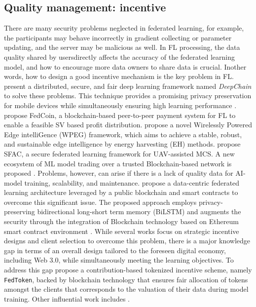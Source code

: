 \documentclass{article}
\begin{document}
\subsection{Quality management: incentive}
There are many security problems neglected in federated learning, for example, the participants may behave incorrectly in gradient collecting or parameter updating, and the server may be malicious as well. In FL processing, the data quality shared by usersdirectly aﬀects the accuracy of the federated learning model, and how to encourage more data owners to share data is crucial. Inother words, how to design a good incentive mechanism is the key problem in FL. 
\newline \newline \cite{weng_2019} present a distributed, secure, and fair deep learning framework named \textit{DeepChain} to solve these problems. This technique provides a promising privacy preservation for mobile devices while simultaneously ensuring high learning performance \cite{kang_2019}. \cite{liu_fedcoin_2020} propose FedCoin, a blockchain-based peer-to-peer payment system for FL to enable a feasible SV based profit distribution. \cite{lin_2022} propose a novel Wirelessly Powered Edge intelliGence (WPEG) framework, which aims to achieve a stable, robust, and sustainable edge intelligence by energy harvesting (EH) methods. \cite{wang_2020} propose SFAC, a secure federated learning framework for UAV-assisted MCS. A new ecosystem of ML model trading over a trusted Blockchain-based network is proposed \cite{nguyen_2021}. Problems, however, can arise if there is a lack of quality data for AI-model training, scalability, and maintenance. \cite{chaabene_2022} propose a data-centric federated learning architecture leveraged by a public blockchain and smart contracts to overcome this significant issue. The proposed approach employs privacy-preserving bidirectional long-short term memory (BiLSTM) and augments the security through the integration of Blockchain technology based on Ethereum smart contract environment \cite{rahmadika_2022}. While several works focus on strategic incentive designs and client selection to overcome this problem, there is a major knowledge gap in terms of an overall design tailored to the foreseen digital economy, including Web 3.0, while simultaneously meeting the learning objectives. To address this gap \cite{pandey_2022} propose a contribution-based tokenized incentive scheme, namely \texttt{FedToken}, backed by blockchain technology that ensures fair allocation of tokens amongst the clients that corresponds to the valuation of their data during model training. Other influential work includes \cite{lu_2020}. 
\end{document}
